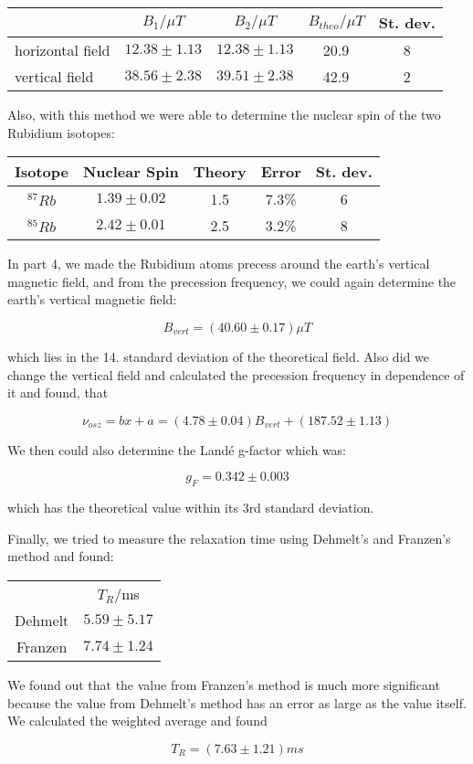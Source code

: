 \begin{center}
\begin{tabular}[H]{| l | c c c c |} \hline
 & $B_1 /\mu T$ & $B_2 /\mu T$ & $B_{theo} /\mu T$ & St. dev.\\ \hline
horizontal field & $12.38 \pm 1.13$ & $12.38 \pm 1.13$ &  20.9 & 8 \\
vertical field & $38.56 \pm 2.38$ & $39.51 \pm 2.38$ & 42.9 & 2 \\ \hline
\end{tabular}
\end{center}

Also, with this method we were able to determine the nuclear spin of the two Rubidium isotopes:

\begin{center}
\begin{tabular}[H]{| c | c c c c |} \hline
Isotope & Nuclear Spin & Theory & Error & St. dev. \\ \hline
 $^{87}Rb$ & $1.39 \pm 0.02$ & 1.5 & 7.3\% & 6 \\
 $^{85}Rb$ & $2.42 \pm 0.01$ & 2.5 & 3.2\% & 8\\  \hline
\end{tabular}
\end{center}

In part 4, we made the Rubidium atoms precess around the earth's vertical magnetic field, and from the precession frequency, we could again determine the earth's vertical magnetic field:

$$B_{vert} = (40.60\pm0.17) \mu T $$

which lies in the 14. standard deviation of the theoretical field. 
Also did we change the vertical field and calculated the precession frequency in dependence of it and found, that 

$$\nu_{osz} = bx + a = (4.78\pm0.04)B_{vert} + (187.52\pm1.13)$$

We then could also determine the Landé g-factor which was:

$$g_F = 0.342 \pm 0.003$$

which has the theoretical value within its 3rd standard deviation.


Finally, we tried to measure the relaxation time using Dehmelt's and Franzen's method and found:

\begin{center}
\begin{tabular}[H]{c c}
		& $T_R$/ms \\
Dehmelt 	& $5.59 \pm 5.17$ \\
Franzen 	& $7.74 \pm 1.24$ \\
\end{tabular}
\end{center}

We found out that the value from Franzen's method is much more significant because the value from Dehmelt's method has an error as large as the value itself. We calculated the weighted average and found

$$T_R = (7.63 \pm 1.21) ms$$







